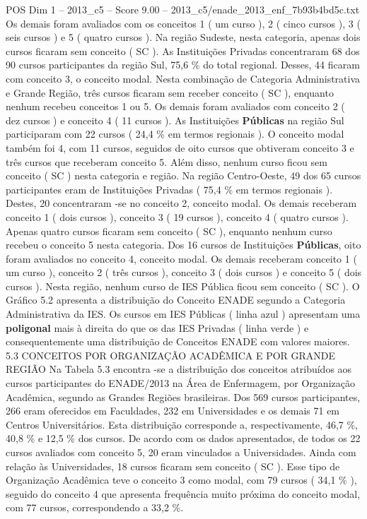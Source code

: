 \begin{textsample}{POS Dim 1 – 2013\_c5 – Score 9.00 – 2013\_c5/enade\_2013\_enf\_7b93b4bd5c.txt}
Os demais foram avaliados com os conceitos 1 ( um curso ), 2 ( cinco cursos ), 3 ( seis cursos ) e 5 ( quatro cursos ).
Na região Sudeste, nesta categoria, apenas dois cursos ficaram sem conceito ( SC ).
As Instituições Privadas concentraram 68 dos 90 cursos participantes da região Sul, 75,6 \% do total regional.
Desses, 44 ficaram com conceito 3, o conceito modal.
Nesta combinação de Categoria Administrativa e Grande Região, três cursos ficaram sem receber conceito ( SC ), enquanto nenhum recebeu conceitos 1 ou 5.
Os demais foram avaliados com conceito 2 ( dez cursos ) e conceito 4 ( 11 cursos ).
As Instituições \textbf{Públicas} na região Sul participaram com 22 cursos ( 24,4 \% em termos regionais ).
O conceito modal também foi 4, com 11 cursos, seguidos de oito cursos que obtiveram conceito 3 e três cursos que receberam conceito 5.
Além disso, nenhum curso ficou sem conceito ( SC ) nesta categoria e região.
Na região Centro-Oeste, 49 dos 65 cursos participantes eram de Instituições Privadas ( 75,4 \% em termos regionais ).
Destes, 20 concentraram -se no conceito 2, conceito modal.
Os demais receberam conceito 1 ( dois cursos ), conceito 3 ( 19 cursos ), conceito 4 ( quatro cursos ).
Apenas quatro cursos ficaram sem conceito ( SC ), enquanto nenhum curso recebeu o conceito 5 nesta categoria.
Dos 16 cursos de Instituições \textbf{Públicas}, oito foram avaliados no conceito 4, conceito modal.
Os demais receberam conceito 1 ( um curso ), conceito 2 ( três cursos ), conceito 3 ( dois cursos ) e conceito 5 ( dois cursos ).
Nesta região, nenhum curso de IES Pública ficou sem conceito ( SC ).
O Gráfico 5.2 apresenta a distribuição do Conceito ENADE segundo a Categoria Administrativa da IES.
Os cursos em IES Públicas ( linha azul ) apresentam uma \textbf{poligonal} mais à direita do que os das IES Privadas ( linha verde ) e consequentemente uma distribuição de Conceitos ENADE com valores maiores. 5.3 CONCEITOS POR ORGANIZAÇÃO ACADÊMICA E POR GRANDE REGIÃO Na Tabela 5.3 encontra -se a distribuição dos conceitos atribuídos aos cursos participantes do ENADE/2013 na Área de Enfermagem, por Organização Acadêmica, segundo as Grandes Regiões brasileiras.
Dos 569 cursos participantes, 266 eram oferecidos em Faculdades, 232 em Universidades e os demais 71 em Centros Universitários.
Esta distribuição corresponde a, respectivamente, 46,7 \%, 40,8 \% e 12,5 \% dos cursos.
De acordo com os dados apresentados, de todos os 22 cursos avaliados com conceito 5, 20 eram vinculados a Universidades.
Ainda com relação às Universidades, 18 cursos ficaram sem conceito ( SC ).
Esse tipo de Organização Acadêmica teve o conceito 3 como modal, com 79 cursos ( 34,1 \% ), seguido do conceito 4 que apresenta frequência muito próxima do conceito modal, com 77 cursos, correspondendo a 33,2 \%.

\end{textsample}
